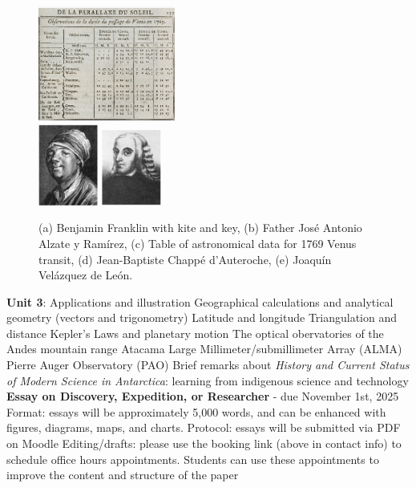 \documentclass[10pt]{article}
\begin{document}
\begin{outline}[enumerate]
\begin{figure}
\includegraphics[width=0.40\textwidth]{figures/1769_transit.png} \\
\includegraphics[width=0.175\textwidth]{figures/Abbot_dAuteroche.png}
\includegraphics[width=0.175\textwidth]{figures/joaquin_v_d_Leon.png}
\caption{\label{fig:franklin} (a) Benjamin Franklin with kite and key, (b) Father Jos\'{e} Antonio Alzate y Ram\'{i}rez, (c) Table of astronomical data for 1769 Venus transit, (d) Jean-Baptiste Chapp\'{e} d'Auteroche, (e) Joaqu\'{i}n Vel\'{a}zquez de Le\'{o}n.}
\end{figure}
\1 \textbf{Unit 3}: Applications and illustration
\2 Geographical calculations and analytical geometry (vectors and trigonometry)
\3 Latitude and longitude
\3 Triangulation and distance
\3 Kepler's Laws and planetary motion
\3 The optical obervatories of the Andes mountain range
\2 Atacama Large Millimeter/submillimeter Array (ALMA)
\2 Pierre Auger Observatory (PAO)
\2 Brief remarks about \textit{History and Current Status of Modern Science in Antarctica}: learning from indigenous science and technology
\1 \textbf{Essay on Discovery, Expedition, or Researcher} - due November 1st, 2025
\2 Format: essays will be approximately 5,000 words, and can be enhanced with figures, diagrams, maps, and charts.
\2 Protocol: essays will be submitted via PDF on Moodle
\2 Editing/drafts: please use the booking link (above in contact info) to schedule office hours appointments.  Students can use these appointments to improve the content and structure of the paper

\end{outline}
\end{document}
